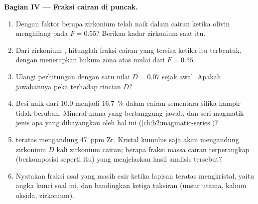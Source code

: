 \begin{problem}
\noindent\textbf{Bagian IV --- Fraksi cairan di puncak.}
\begin{enumerate}[resume]
\item Dengan faktor berapa zirkonium telah naik dalam cairan ketika olivin menghilang pada
$F = 0.55$? Berikan kadar zirkonium saat itu.
\item Dari zirkonium , hitunglah fraksi cairan yang tersisa ketika  itu
terbentuk, dengan menerapkan hukum zona atas mulai dari $F = 0.55$.
\item Ulangi perhitungan dengan satu nilai $D = 0.07$ sejak awal. Apakah jawabannya
peka terhadap rincian $D$?
\item Besi naik dari 10.0 menjadi \qty{16.7}{\percent} dalam cairan sementara silika hampir tidak
berubah. Mineral mana yang bertanggung jawab, dan seri magmatik jenis apa yang
dibayangkan oleh hal ini (\cref{ch:b2:magmatic-series})?
\item {} teratas mengandung \qty{47}{ppm} Zr. Kristal kumulus saja akan mengandung zirkonium
$\bar D$ kali zirkonium cairan; berapa fraksi massa cairan terperangkap
(berkomposisi seperti  itu) yang menjelaskan hasil analisis tersebut?
\item Nyatakan fraksi  asal yang masih cair ketika lapisan teratas
mengkristal, yaitu angka kunci soal ini, dan bandingkan ketiga taksiran
(unsur utama, kalium oksida, zirkonium).
\end{enumerate}
\end{problem}
